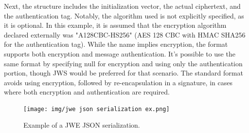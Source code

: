 Next, the structure includes the initialization vector, the actual
ciphertext, and the authentication tag. Notably, the algorithm used is
not explicitly specified, as it is optional. In this example, it is
assumed that the encryption algorithm declared externally was
"A128CBC-HS256" (AES 128 CBC with HMAC SHA256 for the authentication
tag). While the name implies encryption, the format supports both
encryption and message authentication. It's possible to use the same
format by specifying null for encryption and using only the
authentication portion, though JWS would be preferred for that
scenario. The standard format avoids using encryption, followed by
re-encapsulation in a signature, in cases where both encryption and
authentication are required.

\begin{figure}[H]
  \centering
  \texttt{[image: img/jwe json serialization
  ex.png]}
  \caption{Example of a JWE JSON serialization.}
  \label{fig:jwe json ex}
\end{figure}

